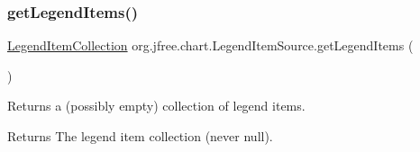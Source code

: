 \subsubsection{\texorpdfstring{get\+Legend\+Items()}{getLegendItems()}}
{\footnotesize\ttfamily \mbox{\hyperlink{classorg_1_1jfree_1_1chart_1_1_legend_item_collection}{Legend\+Item\+Collection}} org.\+jfree.\+chart.\+Legend\+Item\+Source.\+get\+Legend\+Items (\begin{DoxyParamCaption}{ }\end{DoxyParamCaption})}

Returns a (possibly empty) collection of legend items.

\begin{DoxyReturn}{Returns}
The legend item collection (never {\ttfamily null}). 
\end{DoxyReturn}


